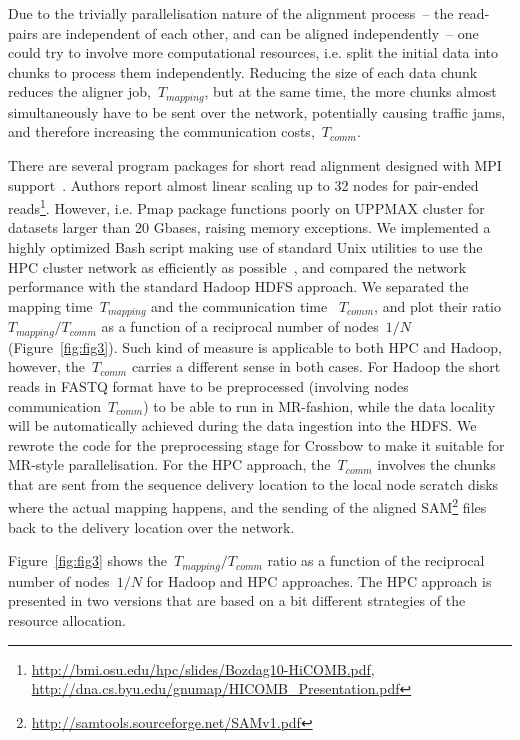 \documentclass[11pt, oneside]{article}   	%
\begin{document}
Due to the trivially parallelisation nature of the alignment process~-- the read-pairs are independent of each other, and can be aligned independently~-- one could try to involve more computational resources, i.e. split the initial data into chunks to process them independently.
Reducing the size of each data chunk reduces the aligner  job,~$T_{mapping}$, but at the same time, the more chunks almost simultaneously have to be sent over the network, potentially causing traffic jams, and therefore increasing the communication costs,~$T_{comm}$.

There are several program packages for short read alignment designed with MPI support~\cite{pmap, gnumap}. Authors report almost linear scaling up to 32 nodes for pair-ended reads\footnote{\url{http://bmi.osu.edu/hpc/slides/Bozdag10-HiCOMB.pdf}, \url{http://dna.cs.byu.edu/gnumap/HICOMB_Presentation.pdf}}. However,  i.e. Pmap package functions poorly on UPPMAX cluster for  datasets larger than 20 Gbases, raising memory exceptions.
We implemented a highly optimized Bash script making use of standard Unix utilities to use the  HPC cluster network as efficiently as possible~\cite{repo},  and compared the network performance with the standard Hadoop HDFS approach. We separated the mapping time~$T_{mapping}$ and the  communication time~ $T_{comm}$, and plot their ratio~$T_{mapping}/T_{comm}$ as a function of a reciprocal number of nodes~$1/N$ (Figure~\ref{fig:fig3}). 
Such kind of measure is applicable to both HPC and Hadoop, however, the~$T_{comm}$ carries a different sense in both cases. For Hadoop the short reads in FASTQ format have to be preprocessed (involving nodes communication~$T_{comm}$) to be able to run in MR-fashion, while the data locality will be automatically achieved during the data  ingestion into the HDFS. 
We rewrote the code for the preprocessing stage for Crossbow to make it suitable for MR-style parallelisation.
For the HPC approach, the~$T_{comm}$ involves the chunks that are sent from the sequence delivery location to the local node scratch disks where the actual mapping happens, and the sending of the aligned SAM\footnote{\url{http://samtools.sourceforge.net/SAMv1.pdf}} files back to the delivery location over the network.

Figure~\ref{fig:fig3} shows the~$T_{mapping}/T_{comm}$ ratio as a function of the reciprocal number of nodes~$1/N$ for Hadoop and HPC approaches. The HPC approach is presented in two versions that are based on a bit different strategies of the resource allocation.  
\end{document}
